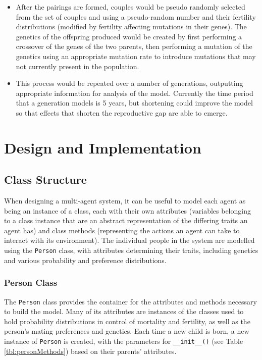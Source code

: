 \documentclass[authoryearcitations]{UoYCSproject}
\begin{document}
\begin{itemize}
\item After the pairings are formed, couples would be pseudo randomly selected from the set of couples and using a pseudo-random number and their fertility distributions (modified by fertility affecting mutations in their genes). The genetics of the offspring produced would be created by first performing a crossover of the genes of the two parents, then performing a mutation of the genetics using an appropriate mutation rate to introduce mutations that may not currently present in the population.

\item This process would be repeated over a number of generations, outputting appropriate information for analysis of the model. Currently the time period that a generation models is 5 years, but shortening could improve the model so that effects that shorten the reproductive gap are able to emerge.

\end{itemize}

\chapter{Design and Implementation}
\label{cha:Design and Implementation}

\section{Class Structure}
When designing a multi-agent system, it can be useful to model each agent as being an instance of a class, each with their own attributes (variables belonging to a class instance that are an abstract representation of the differing traits an agent has) and class methods (representing the actions an agent can take to interact with its environment). The individual people in the system are modelled using the \texttt{Person} class, with attributes determining their traits, including genetics and various probability and preference distributions. 

\newpage
\subsection{Person Class}
The \texttt{Person} class provides the container for the attributes and methods necessary to build the model. Many of its attributes are instances of the classes used to hold probability distributions in control of mortality and fertility, as well as the person's mating preferences and genetics. Each time a new child is born, a new instance of \texttt{Person} is created, with the parameters for \texttt{\_\_init\_\_()} (see Table \ref{tbl:personMethods}) based on their parents' attributes.
\end{document}
